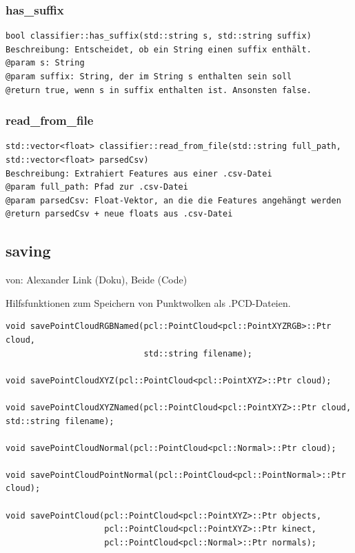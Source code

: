 \documentclass{suturo}
\makeatletter
\newcommand{\chapterauthor}[1]{%
  {\parindent0pt\vspace*{-27pt}%
  \linespread{0}\small\begin{flushright}von: #1\end{flushright}%
  \par\nobreak\vspace*{0pt}}
  \@afterheading%
}
\makeatother
\begin{document}
\subsubsection{has\_suffix}
\begin{verbatim}
bool classifier::has_suffix(std::string s, std::string suffix)
Beschreibung: Entscheidet, ob ein String einen suffix enthält.
@param s: String
@param suffix: String, der im String s enthalten sein soll
@return true, wenn s in suffix enthalten ist. Ansonsten false.
\end{verbatim}\label{func:hassuffix}

\subsubsection{read\_from\_file}
\begin{verbatim}
std::vector<float> classifier::read_from_file(std::string full_path, 
std::vector<float> parsedCsv)
Beschreibung: Extrahiert Features aus einer .csv-Datei
@param full_path: Pfad zur .csv-Datei
@param parsedCsv: Float-Vektor, an die die Features angehängt werden
@return parsedCsv + neue floats aus .csv-Datei
\end{verbatim}\label{func:readfromfile}


\subsection*{saving}
\chapterauthor{Alexander Link (Doku), Beide (Code)}
Hilfsfunktionen zum Speichern von Punktwolken als .PCD-Dateien.

\begin{verbatim}
void savePointCloudRGBNamed(pcl::PointCloud<pcl::PointXYZRGB>::Ptr cloud,
                            std::string filename);
                            
void savePointCloudXYZ(pcl::PointCloud<pcl::PointXYZ>::Ptr cloud);

void savePointCloudXYZNamed(pcl::PointCloud<pcl::PointXYZ>::Ptr cloud,
std::string filename);

void savePointCloudNormal(pcl::PointCloud<pcl::Normal>::Ptr cloud);

void savePointCloudPointNormal(pcl::PointCloud<pcl::PointNormal>::Ptr cloud);

void savePointCloud(pcl::PointCloud<pcl::PointXYZ>::Ptr objects,
                    pcl::PointCloud<pcl::PointXYZ>::Ptr kinect,
                    pcl::PointCloud<pcl::Normal>::Ptr normals);
\end{verbatim}
\end{document}
